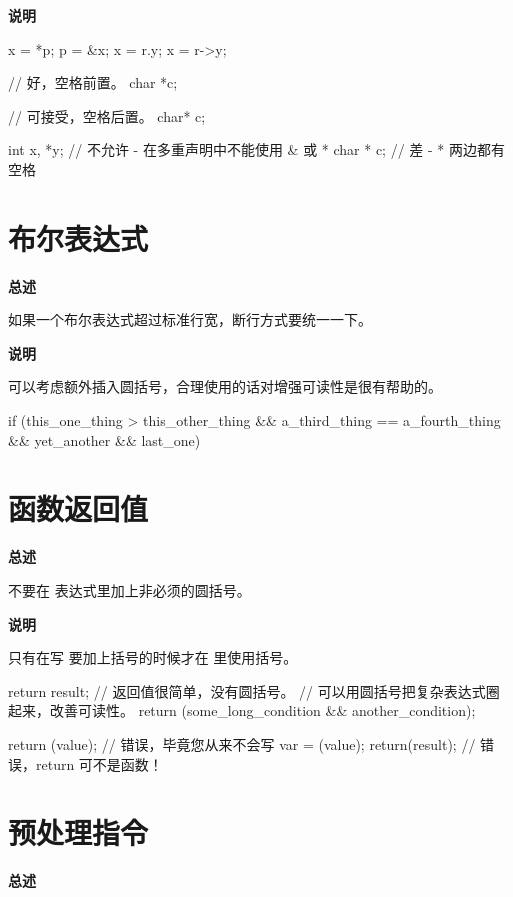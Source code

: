 \textbf{说明}

\begin{ccode}
x = *p;
p = &x;
x = r.y;
x = r->y;

// 好，空格前置。
char *c;

// 可接受，空格后置。
char* c;

int x, *y;  // 不允许 - 在多重声明中不能使用 & 或 *
char * c;   // 差 - * 两边都有空格
\end{ccode}

\section{布尔表达式}

\textbf{总述}

如果一个布尔表达式超过标准行宽，断行方式要统一一下。

\textbf{说明}

可以考虑额外插入圆括号，合理使用的话对增强可读性是很有帮助的。

\begin{ccode}
    if (this_one_thing > this_other_thing
        && a_third_thing == a_fourth_thing
        && yet_another
        && last_one) {
    }
\end{ccode}

\section{函数返回值}

\textbf{总述}

不要在  表达式里加上非必须的圆括号。

\textbf{说明}

只有在写  要加上括号的时候才在  里使用括号。

\begin{ccode}
return result;  // 返回值很简单，没有圆括号。
// 可以用圆括号把复杂表达式圈起来，改善可读性。
return (some_long_condition &&
        another_condition);

return (value);                // 错误，毕竟您从来不会写 var = (value);
return(result);                // 错误，return 可不是函数！
\end{ccode}

\section{预处理指令}

\textbf{总述}

